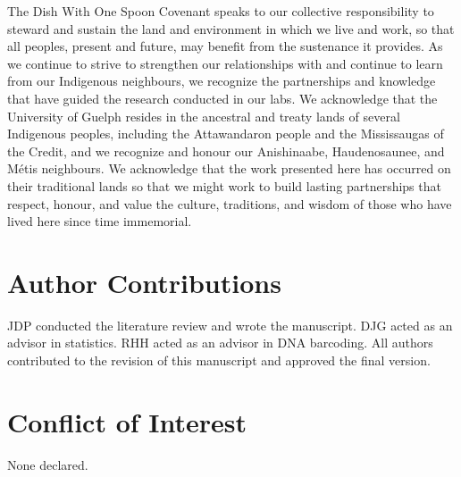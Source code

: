 \vspace{5mm}

The Dish With One Spoon Covenant speaks to our collective responsibility to steward and sustain the land and environment in which we live and work, so that all peoples, present and future, may benefit from the sustenance it provides. As we continue to strive to strengthen our relationships with and continue to learn from our Indigenous neighbours, we recognize the partnerships and knowledge that have guided the research conducted in our labs. We acknowledge that the University of Guelph resides in the ancestral and treaty lands of several Indigenous peoples, including the Attawandaron people and the Mississaugas of the Credit, and we recognize and honour our Anishinaabe, Haudenosaunee, and M{\'e}tis neighbours. We acknowledge that the work presented here has occurred on their traditional lands so that we might work to build lasting partnerships that respect, honour, and value the culture, traditions, and wisdom of those who have lived here since time immemorial.

\vspace{5mm}

\section*{Author Contributions}

JDP conducted the literature review and wrote the manuscript. DJG acted as an advisor in statistics. RHH acted as an advisor in DNA barcoding. All authors contributed to the revision of this manuscript and approved the final version. 

\vspace{5mm}

\section*{Conflict of Interest}

None declared.
